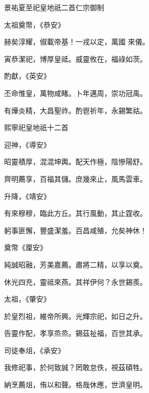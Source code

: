 \begin{pinyinscope}
 景祐夏至祀皇地祇二首仁宗御制



 太祖奠幣，《恭安》



 赫矣淳耀，俶載帝基！一戎以定，萬國
 來儀。



 寅恭潔祀，博厚皇祗。威靈攸在，福祿如茨。



 酌獻，《英安》



 丕命惟皇，萬物咸睹。卜年邁周，崇功冠禹。



 有燁炎精，大昌聖祚。酌鬯祈年，永錫繁祜。



 熙寧祀皇地祇十二首



 迎神，《導安》



 昭靈積厚，混混坤輿。配天作極，陰慘陽舒。



 齊明薦享，百福其儲。庶幾來止，風馬雲車。



 升降，《靖安》



 有來穆穆，臨此方丘。其行風動，其止霆收。



 躬事匪懈，豐盛潔羞。百昌咸殖，允矣神休！



 奠幣《厘安》



 純誠昭融，芳美嘉薦。肅將二精，以享以奠。



 休光四充，靈祗來燕。其祥伊何？永世錫羨。



 太祖，《肇安》



 於皇烈祖，維帝所興。光輝宗祀，如日之升。



 告靈作配，孝享烝烝。錫茲祉福，百世其承。



 司徒奉俎，《承安》



 我修祀事，於何致誠？罔敢怠佚，視茲碩牲。



 納烹薦俎，侑以和聲。格哉休應，世濟皇明。




\end{pinyinscope}

